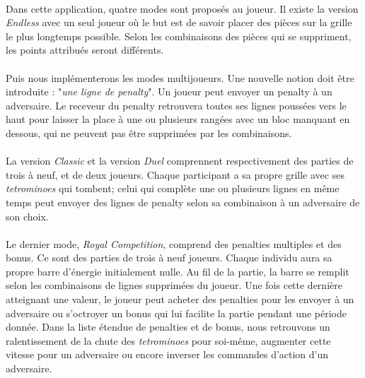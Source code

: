 \documentclass{article}
\begin{document}
\paragraph*{}

Dans cette application, quatre modes sont proposés au joueur. Il existe la version \textit{Endless} avec un seul joueur où le but est de savoir placer des pièces sur la grille le plus longtemps possible. Selon les combinaisons des pièces qui se suppriment, les points attribués seront différents.
 
\paragraph*{}

Puis nous implémenterons les modes multijoueurs. Une nouvelle notion doit être introduite : "\textit{une ligne de penalty}". Un joueur peut envoyer un penalty à un adversaire. Le receveur du penalty retrouvera toutes ses lignes poussées vers le haut pour laisser la place à une ou plusieurs rangées avec un bloc manquant en dessous, qui ne peuvent pas être supprimées par les combinaisons.  

\paragraph*{}

La version \textit{Classic} et la version \textit{Duel} comprennent respectivement des parties de trois à neuf, et de deux joueurs. Chaque participant a sa propre grille avec ses \textit{tetrominoes} qui tombent; celui qui complète une ou plusieurs lignes en même temps peut envoyer des lignes de penalty selon sa combinaison à un adversaire de son choix. 

\paragraph*{}

Le dernier mode, \textit{ Royal Competition}, comprend des penalties multiples et des bonus. Ce sont des parties de trois à neuf joueurs. Chaque individu aura sa propre barre d'énergie initialement nulle. Au fil de la partie, la barre se remplit selon les combinaisons de lignes supprimées du joueur. Une fois cette dernière atteignant une valeur, le joueur peut acheter des penalties pour les envoyer à un adversaire ou s'octroyer un bonus qui lui facilite la partie pendant une période donnée. Dans la liste étendue de penalties et de bonus, nous retrouvons un ralentissement de la chute des \textit{tetrominoes} pour soi-même, augmenter cette vitesse pour un adversaire ou encore inverser les commandes d'action d'un adversaire.
\end{document}
